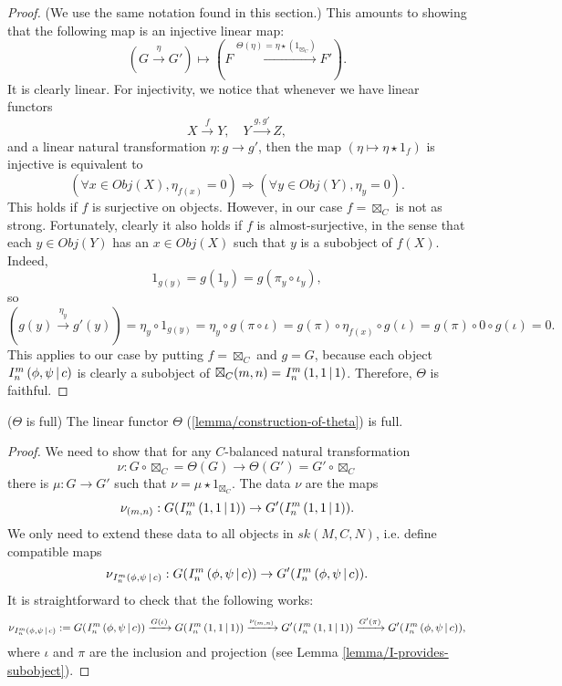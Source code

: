 \begin{proof}
  (We use the same notation found in this section.) This amounts to showing
  that the following map is an injective linear map:
  \[
    (G \xrightarrow{\eta} G') \mapsto (F \xrightarrow{\Theta(\eta) = \eta \star (1_{\boxtimes_{C}})} F').
  \]
  It is clearly linear. For injectivity, we notice that whenever we have
  linear functors
  \[
    X \xrightarrow{f} Y,\quad Y \xrightarrow{g, g'} Z,
  \]
  and a linear natural transformation $\eta: g \to g'$, then the map $(\eta \mapsto \eta \star 1_{f})$ is injective is equivalent to
  \[
    (\forall x \in Obj(X), \eta_{f(x)} = 0) \Rightarrow (\forall y \in Obj(Y), \eta_{y} = 0).
  \]
  This holds if $f$ is surjective on objects. However, in our case
  $f = \boxtimes_{C}$ is not as strong. Fortunately, clearly it also holds if
  $f$ is almost-surjective, in the sense that each $y \in Obj(Y)$ has an
  $x \in Obj(X)$ such that $y$ is a subobject of $f(X)$. Indeed,
  \[
    1_{g(y)} = g(1_{y}) = g(\pi_{y} \circ \iota_{y}),
  \]
  so
  \[
    (g(y) \xrightarrow{\eta_{y}} g'(y)) = \eta_{y} \circ 1_{g(y)} = \eta_{y} \circ g(\pi \circ \iota) = g(\pi) \circ \eta_{f(x)} \circ g(\iota) = g(\pi) \circ 0 \circ g(\iota) = 0.
  \]
  This applies to our case by putting $f = \boxtimes_{C}$ and $g = G$, because
  each object ${}^{}_{} I^{m}_{n} \left( \phi, \psi \,\middle|\, c \right)$ is clearly a subobject of
  $\boxtimes_{C}(m,n) = {}^{}_{} I^{m}_{n} \left( 1, 1 \,\middle|\, 1 \right)$. Therefore, $\Theta$ is faithful.
\end{proof}

\begin{lemma}\label{lemma/theta-is-full} ($\Theta$ is full)
  The linear functor $\Theta$ (\ref{lemma/construction-of-theta}) is full.
\end{lemma}

\begin{proof}
  We need to show that for any $C$-balanced natural transformation
  \[
    \nu: G \circ \boxtimes_{C} = \Theta(G) \to \Theta(G') = G' \circ \boxtimes_{C}
  \]
  there is $\mu: G \to G'$ such that $\nu = \mu \star 1_{\boxtimes_{C}}$. The data $\nu$ are the maps
  \[
    \nu_{(m,n)}: G({}^{}_{} I^{m}_{n} \left( 1, 1 \,\middle|\, 1 \right)) \to G'({}^{}_{} I^{m}_{n} \left( 1, 1 \,\middle|\, 1 \right)).
  \]
  We only need to extend these data to all objects in $sk(M,C,N)$, i.e. define compatible maps
  \[
    \nu_{{}^{}_{} I^{m}_{n} \left( \phi, \psi \,\middle|\, c \right)}: G({}^{}_{} I^{m}_{n} \left( \phi, \psi \,\middle|\, c \right)) \to G'({}^{}_{} I^{m}_{n} \left( \phi, \psi \,\middle|\, c \right)).
  \]
  It is straightforward to check that the following works:
  \[
    \nu_{{}^{}_{} I^{m}_{n} \left( \phi, \psi \,\middle|\, c \right)}:= G({}^{}_{} I^{m}_{n} \left( \phi, \psi \,\middle|\, c \right))
    \xrightarrow{G(\iota)}
    G({}^{}_{} I^{m}_{n} \left( 1, 1 \,\middle|\, 1 \right))
    \xrightarrow{\nu_{(m,n)}}
    G'({}^{}_{} I^{m}_{n} \left( 1, 1 \,\middle|\, 1 \right))
    \xrightarrow{G'(\pi)}
    G'({}^{}_{} I^{m}_{n} \left( \phi, \psi \,\middle|\, c \right)),
  \]
  where $\iota$ and $\pi$ are the inclusion and projection (see
  Lemma \ref{lemma/I-provides-subobject}).
\end{proof}

